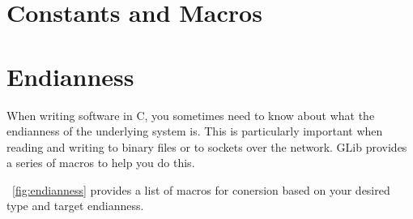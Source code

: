 \section{Constants and Macros}

\section{Endianness}

When writing software in C, you sometimes need to know about what the endianness of the underlying system is.
This is particularly important when reading and writing to binary files or to sockets over the network.
GLib provides a series of macros to help you do this.

~\ref{fig:endianness} provides a list of macros for conersion based on your desired type and target endianness.

